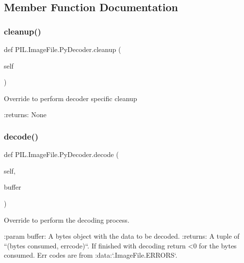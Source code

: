 \subsection{Member Function Documentation}
\mbox{\label{classPIL_1_1ImageFile_1_1PyDecoder_a17d825b7012ec4b6a3ca88f236d6cee2}} 
\subsubsection{\texorpdfstring{cleanup()}{cleanup()}}
{\footnotesize\ttfamily def P\+I\+L.\+Image\+File.\+Py\+Decoder.\+cleanup (\begin{DoxyParamCaption}\item[{}]{self }\end{DoxyParamCaption})}

\begin{DoxyVerb}Override to perform decoder specific cleanup

:returns: None
\end{DoxyVerb}
 \mbox{\label{classPIL_1_1ImageFile_1_1PyDecoder_a2de3fa244058073809e5f82fb5fc246b}} 
\subsubsection{\texorpdfstring{decode()}{decode()}}
{\footnotesize\ttfamily def P\+I\+L.\+Image\+File.\+Py\+Decoder.\+decode (\begin{DoxyParamCaption}\item[{}]{self,  }\item[{}]{buffer }\end{DoxyParamCaption})}

\begin{DoxyVerb}Override to perform the decoding process.

:param buffer: A bytes object with the data to be decoded.
:returns: A tuple of ``(bytes consumed, errcode)``.
    If finished with decoding return <0 for the bytes consumed.
    Err codes are from :data:`.ImageFile.ERRORS`.
\end{DoxyVerb}
 \mbox{\label{classPIL_1_1ImageFile_1_1PyDecoder_a73adfa84df7f437649d905615f0bbf66}} 

